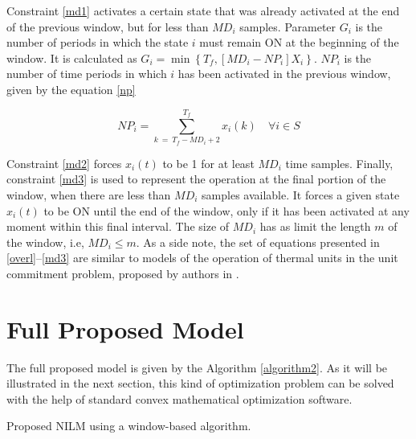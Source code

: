 Constraint \eqref{md1} activates a certain state that was already activated at the end of the previous window, but for less than $MD_i$ samples. Parameter $G_i$ is the number of periods in which the state $i$ must remain ON at the beginning of the window. It is calculated as $G_i = \min \left\{ T_f, \left[ MD_i - NP_i \right] X_i \right\}$. $NP_i$ is the number of time periods in which $i$ has been activated in the previous window, given by the equation \eqref{np}

\begin{equation} \label{np}
    NP_i = \sum_{k\ =\ T_f - MD_i + 2}^{T_f} { x_i(k) } \quad \forall i \in S
\end{equation}

Constraint \eqref{md2} forces $x_i(t)$ to be 1 for at least $MD_i$ time samples. Finally, constraint \eqref{md3} is used to represent the operation at the final portion of the window, when there are less than $MD_i$ samples available. It forces a given state $x_i(t)$ to be ON until the end of the window, only if it has been activated at any moment within this final interval. The size of $MD_i$ has as limit the length $m$ of the window, i.e, $MD_i \leq m$. 
As a side note, the set of equations presented in \eqref{overl}--\eqref{md3} are similar to models of the operation of thermal units in the unit commitment problem, proposed by authors in \cite{carrion2006}.

\section{Full Proposed Model}

The full proposed model is given by the Algorithm \ref{algorithm2}. As it will be illustrated in the next section, this kind of optimization problem can be solved with the help of standard convex mathematical optimization software. 

\begin{algorithm}[H]\label{algorithm2}
\SetAlgoLined
\caption{Proposed NILM using a window-based algorithm.}
\end{algorithm}

